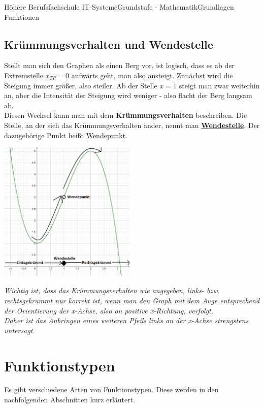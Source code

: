 \documentclass[11pt,twocolumn,oneside,openany,headings=optiontotoc,11pt,numbers=noenddot]{article}
\begin{document}
\begin{worksheet}{Höhere Berufsfachschule IT-Systeme}{Grundstufe - Mathematik}{Grundlagen Funktionen}
		\subsection*{Krümmungsverhalten und Wendestelle}
		Stellt man sich den Graphen als einen Berg vor, ist logisch, dass es ab der Extremstelle \(x_{TP} = 0\) aufwärts geht, man also ansteigt. Zunächst wird die Steigung immer größer, also steiler. Ab der Stelle \(x = 1\) steigt man zwar weiterhin an, aber die Intensität der Steigung wird weniger - also flacht der Berg langsam ab.\\
		Diesen Wechsel kann man mit dem \textbf{Krümmungsverhalten} beschreiben. Die Stelle, an der sich das Krümmungsverhalten änder, nennt man \textbf{\underline{Wendestelle}}. Der dazugehörige Punkt heißt \underline{Wendepunkt}.\\
		\par\bigskip\noindent
		\includegraphics[width=0.49\textwidth]{../99_Bilder/WP.png}\\
		\par\bigskip\noindent
		\textit{Wichtig ist, dass das Krümmungsverhalten wie angegeben, \glqq{}links-\grqq{} bzw. \glqq{}rechtsgekrümmt\grqq{} nur korrekt ist, wenn man den Graph mit dem Auge entsprechend der Orientierung der x-Achse, also on positive x-Richtung, verfolgt.\\ Daher ist das Anbringen eines weiteren Pfeils links an der x-Achse strengstens untersagt.}
		\section{Funktionstypen}
		Es gibt verschiedene Arten von Funktionstypen. Diese werden in den nachfolgenden Abschnitten kurz erläutert.

\end{worksheet}
\end{document}

